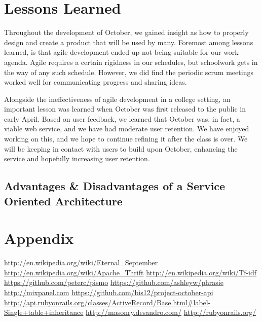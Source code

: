 \documentclass[11pt,letterpaper,titlepage]{article}
\begin{document}
\section{Lessons Learned}
Throughout the development of October, we gained insight as how to properly design and create a product that will be used by many.
Foremost among lessons learned, is that agile development ended up not being suitable for our work agenda.
Agile requires a certain rigidness in our schedules, but schoolwork gets in the way of any such schedule.
However, we did find the periodic scrum meetings worked well for communicating progress and sharing ideas.

Alongside the ineffectiveness of agile development in a college setting, an important lesson was learned when October was first released to the public in early April.
Based on user feedback, we learned that October was, in fact, a viable web service, and we have had moderate user retention.
We have enjoyed working on this, and we hope to continue refining it after the class is over.
We will be keeping in contact with users to build upon October, enhancing the service and hopefully increasing user retention.

\subsection{Advantages \& Disadvantages of a Service Oriented Architecture}

\section{Appendix}

\newpage
\newpage
\begin{thebibliography}{6}
   \url{http://en.wikipedia.org/wiki/Eternal\_September}
   \url{http://en.wikipedia.org/wiki/Apache\_Thrift}
   \url{http://en.wikipedia.org/wiki/Tf-idf}
   \url{https://github.com/peterc/pismo}
   \url{https://github.com/ashleyw/phrasie}
   \url{http://mixpanel.com}
   \url{https://github.com/bis12/project-october-api}
   \url{http://api.rubyonrails.org/classes/ActiveRecord/Base.html#label-Single+table+inheritance}
   \url{http://masonry.desandro.com/}
   \url{http://rubyonrails.org/}
\end{thebibliography}
\end{document}
